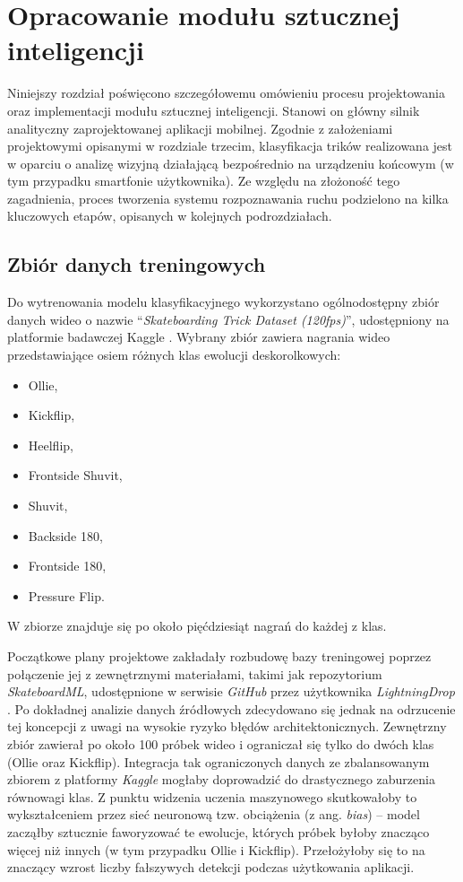 \newpage
\section{Opracowanie modułu sztucznej inteligencji}
    
    Niniejszy rozdział poświęcono szczegółowemu omówieniu procesu projektowania oraz implementacji modułu sztucznej inteligencji. Stanowi on główny silnik analityczny zaprojektowanej aplikacji mobilnej. Zgodnie z założeniami projektowymi opisanymi w rozdziale trzecim, klasyfikacja trików realizowana jest w oparciu o analizę wizyjną działającą bezpośrednio na urządzeniu końcowym (w tym przypadku smartfonie użytkownika). Ze względu na złożoność tego zagadnienia, proces tworzenia systemu rozpoznawania ruchu podzielono na kilka kluczowych etapów, opisanych w kolejnych podrozdziałach. 
    
    \subsection{Zbiór danych treningowych}

        Do wytrenowania modelu klasyfikacyjnego wykorzystano ogólnodostępny zbiór danych wideo o nazwie \enquote{\textit{Skateboarding Trick Dataset (120fps)}}, udostępniony na platformie badawczej Kaggle \cite{kaggle_skateboarding_dataset}. Wybrany zbiór zawiera nagrania wideo przedstawiające osiem różnych klas ewolucji deskorolkowych: 
        \begin{itemize}
            \item Ollie,
            \item Kickflip,
            \item Heelflip,
            \item Frontside Shuvit,
            \item Shuvit,
            \item Backside 180,
            \item Frontside 180,
            \item Pressure Flip.
        \end{itemize}
        W zbiorze znajduje się po około pięćdziesiąt nagrań do każdej z klas.

        Początkowe plany projektowe zakładały rozbudowę bazy treningowej poprzez połączenie jej z zewnętrznymi materiałami, takimi jak repozytorium \textit{SkateboardML}, udostępnione w serwisie \textit{GitHub} przez użytkownika \textit{LightningDrop} \cite{lightningdrop2024}. Po dokładnej analizie danych źródłowych zdecydowano się jednak na odrzucenie tej koncepcji z uwagi na wysokie ryzyko błędów architektonicznych. Zewnętrzny zbiór zawierał po około 100 próbek wideo i ograniczał się tylko do dwóch klas (Ollie oraz Kickflip). Integracja tak ograniczonych danych ze zbalansowanym zbiorem z platformy \textit{Kaggle} mogłaby doprowadzić do drastycznego zaburzenia równowagi klas. Z punktu widzenia uczenia maszynowego skutkowałoby to wykształceniem przez sieć neuronową tzw. obciążenia (z ang. \textit{bias}) – model zacząłby sztucznie faworyzować te ewolucje, których próbek byłoby znacząco więcej niż innych (w tym przypadku Ollie i Kickflip). Przełożyłoby się to na znaczący wzrost liczby fałszywych detekcji podczas użytkowania aplikacji.

